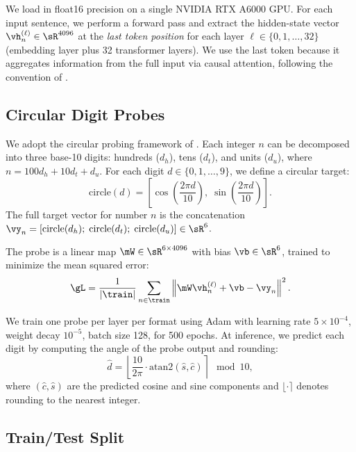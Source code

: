 We load \mistral in float16 precision on a single NVIDIA RTX A6000 GPU. For each input sentence, we perform a forward pass and extract the hidden-state vector $\vh_n^{(\ell)} \in \sR^{4096}$ at the \emph{last token position} for each layer $\ell \in \{0, 1, \ldots, 32\}$ (embedding layer plus 32 transformer layers). We use the last token because it aggregates information from the full input via causal attention, following the convention of \citet{levy2024language}.

\subsection{Circular Digit Probes}
\label{sec:probes}

We adopt the circular probing framework of \citet{levy2024language}. Each integer $n$ can be decomposed into three base-10 digits: hundreds ($d_h$), tens ($d_t$), and units ($d_u$), where $n = 100 d_h + 10 d_t + d_u$. For each digit $d \in \{0, 1, \ldots, 9\}$, we define a circular target:
\begin{equation}
    \text{circle}(d) = \left[\cos\!\left(\frac{2\pi d}{10}\right),\; \sin\!\left(\frac{2\pi d}{10}\right)\right].
    \label{eq:circle}
\end{equation}
The full target vector for number $n$ is the concatenation $\vy_n = [\text{circle}(d_h);\; \text{circle}(d_t);\; \text{circle}(d_u)] \in \sR^6$.

The probe is a linear map $\mW \in \sR^{6 \times 4096}$ with bias $\vb \in \sR^6$, trained to minimize the mean squared error:
\begin{equation}
    \gL = \frac{1}{|\train|} \sum_{n \in \train} \left\| \mW \vh_n^{(\ell)} + \vb - \vy_n \right\|^2.
    \label{eq:loss}
\end{equation}

We train one probe per layer per format using Adam \citep{kingma2015adam} with learning rate $5 \times 10^{-4}$, weight decay $10^{-5}$, batch size 128, for 500 epochs. At inference, we predict each digit by computing the angle of the probe output and rounding:
\begin{equation}
    \hat{d} = \left\lfloor \frac{10}{2\pi} \cdot \text{atan2}(\hat{s}, \hat{c}) \right\rceil \mod 10,
    \label{eq:predict}
\end{equation}
where $(\hat{c}, \hat{s})$ are the predicted cosine and sine components and $\lfloor \cdot \rceil$ denotes rounding to the nearest integer.

\subsection{Train/Test Split}

